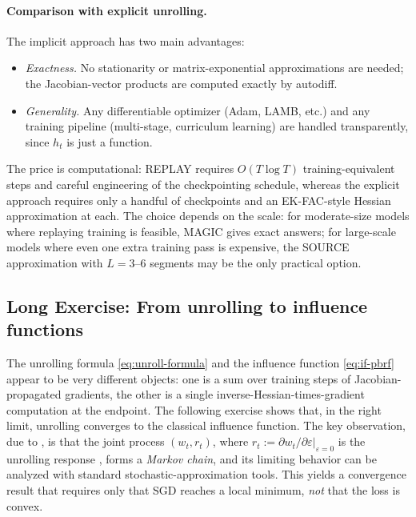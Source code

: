 \documentclass[11pt]{article}
\begin{document}
\paragraph{Comparison with explicit unrolling.} The implicit approach has two main advantages:
\begin{itemize}
  \item \emph{Exactness.} No stationarity or matrix-exponential approximations are needed; the Jacobian-vector products are computed exactly by autodiff.
  \item \emph{Generality.} Any differentiable optimizer (Adam, LAMB, etc.) and any training pipeline (multi-stage, curriculum learning) are handled transparently, since $h_t$ is just a function.
\end{itemize}
The price is computational: REPLAY requires $O(T\log T)$ training-equivalent steps and careful engineering of the checkpointing schedule, whereas the explicit approach requires only a handful of checkpoints and an EK-FAC-style Hessian approximation at each. The choice depends on the scale: for moderate-size models where replaying training is feasible, MAGIC gives exact answers; for large-scale models where even one extra training pass is expensive, the SOURCE approximation with $L = 3$--$6$ segments may be the only practical option.

\subsection{Long Exercise: From unrolling to influence functions}\label{subsec:unroll-to-if}

The unrolling formula \eqref{eq:unroll-formula} and the influence function \eqref{eq:if-pbrf} appear to be very different objects: one is a sum over training steps of Jacobian-propagated gradients, the other is a single inverse-Hessian-times-gradient computation at the endpoint. The following exercise shows that, in the right limit, unrolling converges to the classical influence function. The key observation, due to \citet{mlodozeniec2025distributional}, is that the joint process $(w_t, r_t)$, where $r_t := \partial w_t/\partial\varepsilon\big|_{\varepsilon=0}$ is the unrolling response , forms a \emph{Markov chain}, and its limiting behavior can be analyzed with standard stochastic-approximation tools. This yields a convergence result that requires only that SGD reaches a local minimum, \emph{not} that the loss is convex.
\end{document}
